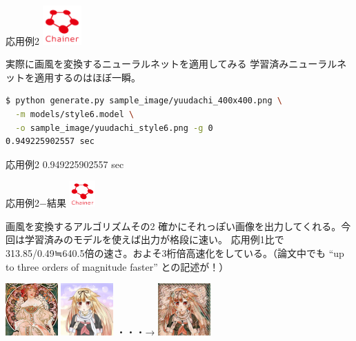 \documentclass[12pt, unicode]{beamer}
\begin{document}
\begin{frame}[fragile]{応用例2}
\includegraphics[clip,width=1.5cm]{image/chainer_logo.png}
\begin{block}{実際に画風を変換するニューラルネットを適用してみる}
学習済みニューラルネットを適用するのはほぼ一瞬。
\end{block}
\begin{lstlisting}[language=bash,basicstyle=\ttfamily\Small,caption={apply trained neural net}]
$ python generate.py sample_image/yuudachi_400x400.png \
  -m models/style6.model \
  -o sample_image/yuudachi_style6.png -g 0
0.949225902557 sec
\end{lstlisting}
\end{frame}

\begin{frame}[fragile]{応用例2}
\Large{0.949225902557 sec}
\end{frame}

\begin{frame}{応用例2−結果}
\includegraphics[clip,width=1.0cm]{image/chainer_logo.png}
\begin{block}{画風を変換するアルゴリズムその2}
確かにそれっぽい画像を出力してくれる。今回は学習済みのモデルを使えば出力が格段に速い。
応用例1比で313.85/0.49≒640.5倍の速さ。およそ3桁倍高速化をしている。（論文中でも ``up to three orders of magnitude faster'' との記述が！）
\end{block}
\includegraphics[clip,width=2.0cm]{image/style_6.png}
\includegraphics[clip,width=2.0cm]{image/yuudachi_400x400.png}
・・・→
\includegraphics[clip,width=2.0cm]{image/yuudachi_style6.jpg}
\end{frame}
\end{document}
